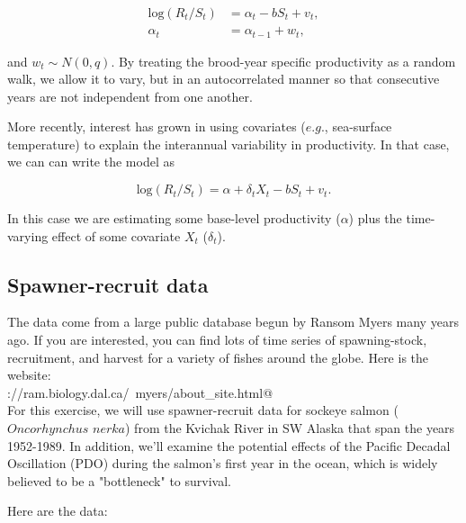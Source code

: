 \documentclass[10pt]{article}
\begin{document}
\begin{equation}\label{eqn:lnTVRicker}
\begin{aligned}
\text{log}(R_t/S_t) &= \alpha_t - b S_t + v_t, \\
\alpha_t &= \alpha_{t-1} + w_t,
\end{aligned}
\end{equation}

\noindent and $w_t \sim N(0,q)$.  By treating the brood-year specific productivity as a random walk, we allow it to vary, but in an autocorrelated manner so that consecutive years are not independent from one another.

More recently, interest has grown in using covariates ($e.g.$, sea-surface temperature) to explain the interannual variability in productivity.  In that case, we can can write the model as

\begin{equation}\label{eqn:lnCovRicker}
\text{log}(R_t/S_t) = \alpha + \delta_t X_t - b S_t + v_t.
\end{equation}

\noindent In this case we are estimating some base-level productivity ($\alpha$) plus the time-varying effect of some covariate $X_t$ ($\delta_t$). 


\subsection{Spawner-recruit data}

The data come from a large public database begun by Ransom Myers many years ago.  If you are interested, you can find lots of time series of spawning-stock, recruitment, and harvest for a variety of fishes around the globe.  Here is the website:\\

\verb@http://ram.biology.dal.ca/~myers/about_site.html@\\

For this exercise, we will use spawner-recruit data for sockeye salmon ($Oncorhynchus$ $nerka$) from the Kvichak River in SW Alaska that span the years 1952-1989.  In addition, we'll examine the potential effects of the Pacific Decadal Oscillation (PDO) during the salmon's first year in the ocean, which is widely believed to be a "bottleneck" to survival.

Here are the data:
\end{document}
